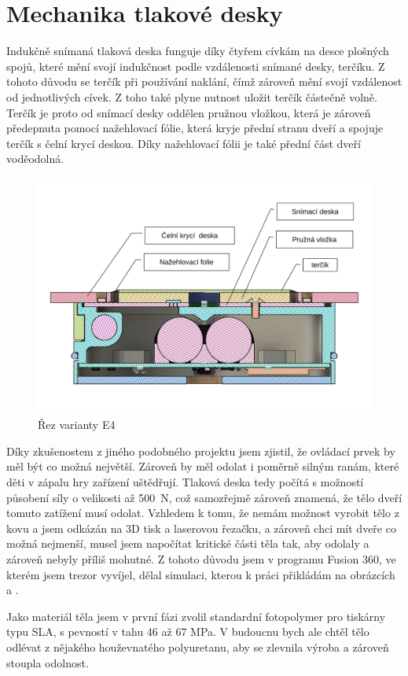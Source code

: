 \section{Mechanika tlakové desky}
\label{E4-mech_tlakovky}

Indukčně snímaná tlaková deska funguje díky čtyřem cívkám na desce ploš\-ných spojů, které mění svojí indukčnost podle vzdálenosti snímané desky, terčíku.
Z tohoto důvodu se terčík při používání naklání, čímž zároveň mění svojí vzdálenost od jednotlivých cívek. Z toho také plyne nutnost uložit terčík
částečně volně. Terčík je proto od snímací desky oddělen pružnou vložkou, která je zároveň předepnuta pomocí nažehlovací fólie, která kryje přední 
stranu dveří a spojuje terčík s čelní krycí deskou. Díky nažehlovací fólii je také přední část dveří voděodolná.

\begin{figure}[h]
    \centering
    \includegraphics[width=\textwidth]{kapitoly/obrazky/E4/machanika_tlakove_desky/rez_po_ose.pdf}
    \caption{Řez varianty E4}
    \label{fig:E4-rez}
\end{figure}

\newpage

Díky zkušenostem z jiného podobného projektu jsem zjistil, že ovládací prvek by měl být co možná největší. 
Zároveň by měl odolat i poměrně silným ranám, které děti v zápalu hry zařízení uštědřují.
Tlaková deska tedy počítá s možností působení síly o velikosti až 500~N, což samozřejmě zároveň znamená, že tělo dveří tomuto zatížení musí odolat.
Vzhledem k tomu, že nemám možnost vyrobit tělo z kovu a jsem odkázán na 3D tisk a laserovou řezačku, a zároveň chci mít dveře co možná nejmenší,
musel jsem napočítat kritické části těla tak, aby odolaly a zároveň nebyly příliš mohutné. Z tohoto důvodu jsem v programu Fusion 360, ve kterém jsem trezor vyvíjel,
dělal simulaci, kterou k práci přikládám na obrázcích  a .

Jako materiál těla jsem v první fázi zvolil standardní fotopolymer pro tiskárny typu SLA, s pevností v tahu 46 až 67 MPa.
V budoucnu bych ale chtěl tělo odlévat z nějakého houževnatého polyuretanu, aby se zlevnila výroba a zároveň stoupla odolnost.